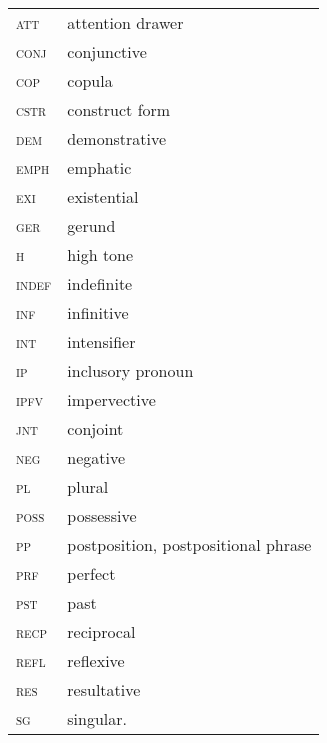 \documentclass[output=paper]{langscibook}
\begin{document}
\begin{tabularx}{.45\textwidth}{lQ}
\textsc{att} & attention drawer\\ 
\textsc{conj} & conjunctive\\ 
\textsc{cop} & copula\\ 
\textsc{cstr} & construct form\\ 
\textsc{dem} & demonstrative\\ 
\textsc{emph} & emphatic\\ 
\textsc{exi} & existential\\
\textsc{ger} & gerund\\ 
\textsc{h} & high tone\\ 
\textsc{indef} & indefinite\\
\textsc{inf} & infinitive\\ 
\textsc{int} & intensifier\\ 
\textsc{ip} & inclusory pronoun\\ 
\textsc{ipfv} & impervective\\ 
\textsc{jnt} & conjoint\\ 
\textsc{neg} & negative\\ 
\textsc{pl} & plural\\ 
\textsc{poss} & possessive\\ 
\textsc{pp} & postposition, postpositional phrase\\ 
\textsc{prf} & perfect\\ 
\textsc{pst} & past\\ 
\textsc{recp} & reciprocal\\ 
\textsc{refl} & reflexive\\ 
\textsc{res} & resultative\\ 
\textsc{sg} & singular.
\end{tabularx}



{\sloppy\printbibliography[heading=subbibliography,notkeyword=this]}
\end{document}
